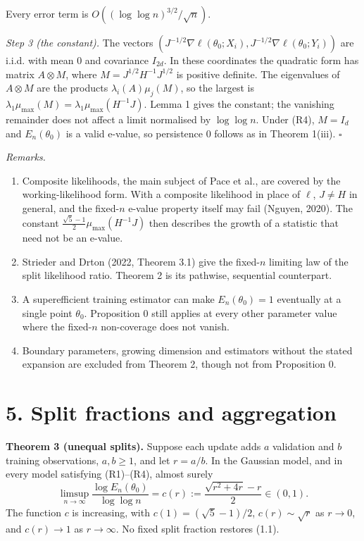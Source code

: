 \documentclass[
  10pt,
  a4paper,
]{article}
\begin{document}
Every error term is \(O((\log\log n)^{3/2}/\sqrt n)\).

\emph{Step 3 (the constant).} The vectors
\((J^{-1/2}\nabla\ell(\theta_0;X_i),J^{-1/2}\nabla\ell(\theta_0;Y_i))\)
are i.i.d. with mean \(0\) and covariance \(I_{2d}\). In these
coordinates the quadratic form has matrix \(A\otimes M\), where
\(M=J^{1/2}H^{-1}J^{1/2}\) is positive definite. The eigenvalues of
\(A\otimes M\) are the products \(\lambda_i(A)\mu_j(M)\), so the largest
is \(\lambda_1\mu_{\max}(M)=\lambda_1\mu_{\max}(H^{-1}J)\). Lemma 1
gives the constant; the vanishing remainder does not affect a limit
normalised by \(\log\log n\). Under (R4), \(M=I_d\) and
\(E_n(\theta_0)\) is a valid e-value, so persistence \(0\) follows as in
Theorem 1(iii). \(\square\)

\emph{Remarks.}

\begin{enumerate}
\def\labelenumi{(\alph{enumi})}
\item
  Composite likelihoods, the main subject of Pace et al., are covered by
  the working-likelihood form. With a composite likelihood in place of
  \(\ell\), \(J\ne H\) in general, and the fixed-\(n\) e-value property
  itself may fail (Nguyen, 2020). The constant
  \(\tfrac{\sqrt5-1}{2}\mu_{\max}(H^{-1}J)\) then describes the growth
  of a statistic that need not be an e-value.
\item
  Strieder and Drton (2022, Theorem 3.1) give the fixed-\(n\) limiting
  law of the split likelihood ratio. Theorem 2 is its pathwise,
  sequential counterpart.
\item
  A superefficient training estimator can make \(E_n(\theta_0)=1\)
  eventually at a single point \(\theta_0\). Proposition 0 still applies
  at every other parameter value where the fixed-\(n\) non-coverage does
  not vanish.
\item
  Boundary parameters, growing dimension and estimators without the
  stated expansion are excluded from Theorem 2, though not from
  Proposition 0.
\end{enumerate}

\section{5. Split fractions and
aggregation}\label{split-fractions-and-aggregation}

\textbf{Theorem 3 (unequal splits).} Suppose each update adds \(a\)
validation and \(b\) training observations, \(a,b\ge1\), and let
\(r=a/b\). In the Gaussian model, and in every model satisfying
(R1)--(R4), almost surely \[
\limsup_{n\to\infty}\frac{\log E_n(\theta_0)}{\log\log n}=c(r):=\frac{\sqrt{r^2+4r}-r}{2}\in(0,1).
\] The function \(c\) is increasing, with \(c(1)=(\sqrt5-1)/2\),
\(c(r)\sim\sqrt r\) as \(r\to0\), and \(c(r)\to1\) as \(r\to\infty\). No
fixed split fraction restores (1.1).
\end{document}
